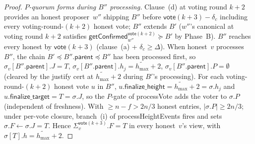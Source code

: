 \ifx\litemode\undefined\documentclass{article}\fi
\newcommand{\parent}{\mathsf{parent}}
\newcommand{\finalizeHeight}{\mathsf{finalize\_height}}
\newcommand{\finalizeTarget}{\mathsf{finalize\_target}}
\newcommand{\hmax}{\ensuremath{h_{\max}}\xspace}
\newcommand{\processHeightEvents}{\textsf{processHeightEvents}\xspace}
\newcommand{\processVote}{\textsf{processVote}\xspace}
\newcommand{\vote}{\ensuremath{\mathsf{vote}}}
\newcommand{\comm}[1]{\ensuremath{\widetilde{#1}}}
\newcommand{\getConfirmed}{\textsf{getConfirmed}\xspace}
\theoremstyle{plain}
\theoremstyle{definition}
\theoremstyle{remark}
\begin{document}
\begin{proof}
\emph{$P$-quorum forms during $B''$ processing.}
Clause~(d) at voting round $k+2$ provides an honest proposer~$w''$ shipping $B''$ before $\vote(k+3) - \delta_c$ including every voting-round-$(k+2)$ honest vote; $B''$ extends $B'$ ($w''$'s canonical at voting round $k+2$ satisfies $\getConfirmed_{w''}^{\vote(k+2)} \succeq B'$ by Phase~B). $B''$ reaches every honest by $\vote(k+3)$ (clause~(a) + $\delta_c \geq \Delta$).
When honest~$v$ processes $B''$, the chain $B' \preceq B''.\parent \preceq B''$ has been processed first, so $\sigma_v[B''.\parent].J = T$, $\sigma_v[B''.\parent].h_j = \comm{\hmax}+2$, $\sigma_v[B''.\parent].P = \emptyset$ (cleared by the justify cert at $\comm{\hmax}+2$ during $B'$'s processing). For each voting-round-$(k+2)$ honest vote $u$ in $B''$, $u.\finalizeHeight = \comm{\hmax}+2 = \sigma.h_j$ and $u.\finalizeTarget = T = \sigma.J$, so the $P$-gate of \processVote{} adds the voter to $\sigma.P$ (independent of freshness). With $\geq n - f > 2n/3$ honest entries, $|\sigma.P| \geq 2n/3$; under per-vote closure, branch~(i) of \processHeightEvents{} fires and sets $\sigma.F \gets \sigma.J = T$.
Hence $\Sigma_v^{\vote(k+3)}.F = T$ in every honest~$v$'s view, with $\sigma[T].h = \comm{\hmax}+2$.


\end{proof}
\end{document}
